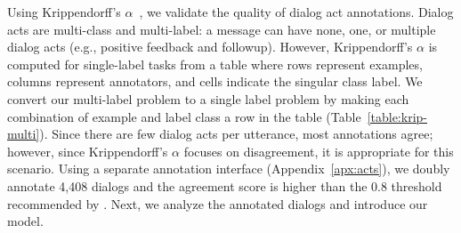 Using Krippendorff's $\alpha$~\citep{kripp2004}, we validate the quality of dialog act annotations.
Dialog acts are multi-class and multi-label: a message can have none, one, or multiple dialog acts (e.g., positive feedback and followup).
However, Krippendorff's $\alpha$ is computed for single-label tasks from a table where rows represent examples, columns represent annotators, and cells indicate the singular class label.
We convert our multi-label problem to a single label problem by making each combination of example and label class a row in the table (Table~\ref{table:krip-multi}).
Since there are few dialog acts per utterance, most annotations agree; however, since Krippendorff's $\alpha$ focuses on disagreement, it is appropriate for this scenario.
Using a separate annotation interface (Appendix~\ref{apx:acts}), we doubly annotate 4,408 dialogs and the agreement score \kripscore{} is higher than the 0.8 threshold recommended by \citet{kripp2004}.
Next, we analyze the annotated dialogs and introduce our model.
